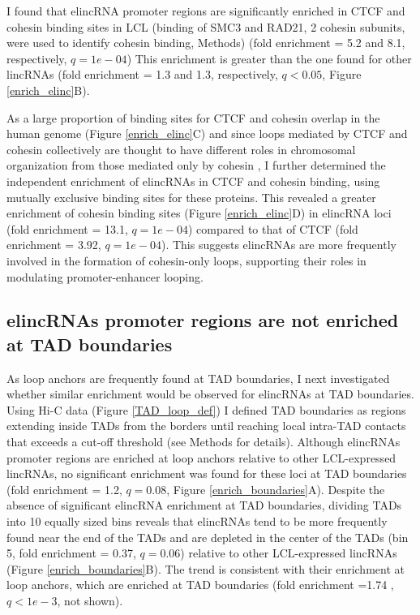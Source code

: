 \documentclass[11pt,a4paper]{report}
\begin{document}
I found that elincRNA promoter regions are significantly enriched in CTCF and cohesin binding sites in LCL (binding of SMC3 and RAD21, 2 cohesin subunits, were used to identify cohesin binding, Methods) (fold enrichment = 5.2 and 8.1, respectively, $q=1e-04$) This enrichment is greater than the one found for other lincRNAs (fold enrichment = 1.3 and 1.3, respectively, $q<0.05$, Figure \ref{enrich_elinc}B).

As a large proportion of binding sites for CTCF and cohesin overlap in the human genome (Figure \ref{enrich_elinc}C) and since loops mediated by CTCF and cohesin collectively are thought to have different roles in chromosomal organization from those mediated only by cohesin \cite{Ji2016}⁠, I further determined the independent enrichment of elincRNAs in CTCF and cohesin binding, using mutually exclusive binding sites for these proteins. This revealed a greater enrichment of cohesin binding sites (Figure \ref{enrich_elinc}D) in elincRNA loci (fold enrichment = 13.1, $q=1e-04$) compared to that of CTCF (fold enrichment = 3.92, $q=1e-04$). This suggests elincRNAs are more frequently involved in the formation of cohesin-only loops, supporting their roles in modulating promoter-enhancer looping.

\subsection*{elincRNAs promoter regions are not enriched at TAD boundaries}

As loop anchors are frequently found at TAD boundaries, I next investigated whether similar enrichment would be observed for elincRNAs at TAD boundaries. Using Hi-C data (Figure \ref{TAD_loop_def}) I defined TAD boundaries as regions extending inside TADs from the borders until reaching local intra-TAD contacts that exceeds a cut-off threshold (see Methods for details). Although elincRNAs promoter regions are enriched at loop anchors relative to other LCL-expressed lincRNAs, no significant enrichment was found for these loci  at TAD boundaries (fold enrichment = 1.2, $q=0.08$, Figure \ref{enrich_boundaries}A). Despite the absence of significant elincRNA enrichment at TAD boundaries, dividing TADs into 10 equally sized bins reveals that elincRNAs tend to be more frequently found near the end of the TADs and are depleted in the center of the TADs (bin 5, fold enrichment = 0.37, $q=0.06$) relative to other LCL-expressed lincRNAs (Figure \ref{enrich_boundaries}B). The trend is consistent with their enrichment at loop anchors, which are enriched at TAD boundaries (fold enrichment =1.74 , $q<1e-3$, not shown).
\end{document}

